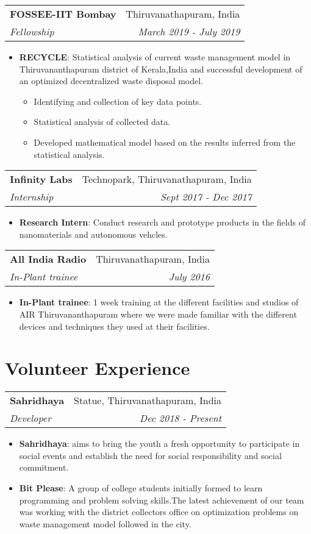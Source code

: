 \documentclass[letterpaper,11pt]{article}
\makeatletter
\newcommand{\resumeItem}[2]{
  \item\small{
    \textbf{#1}{: #2 \vspace{-2pt}}
  }
}
\newcommand{\resumeSubheading}[4]{
  \vspace{-1pt}\item
    \begin{tabular*}{0.97\textwidth}[t]{l@{\extracolsep{\fill}}r}
      \textbf{#1} & #2 \\
      \textit{\small#3} & \textit{\small #4} \\
    \end{tabular*}\vspace{-5pt}
}
\newcommand{\resumeItemListStart}{\begin{itemize}}
\newcommand{\resumeItemListEnd}{\end{itemize}\vspace{-5pt}}
\makeatother
\begin{document}
    \resumeSubheading
      {FOSSEE-IIT Bombay}{Thiruvanathapuram, India}
      {Fellowship}{March 2019 - July 2019}
      \resumeItemListStart
        \resumeItem{RECYCLE}
          {Statistical analysis of current waste management model in Thiruvananthapuram district of Kerala,India and successful development of an optimized decentralized waste disposal model. }
          \begin{itemize}
              \item Identifying and collection of key data points.
              \item Statistical analysis of collected data.
              \item Developed mathematical model based on the results inferred from the statistical analysis.
         \end{itemize}
      \resumeItemListEnd

    \resumeSubheading
      {Infinity Labs}{Technopark, Thiruvanathapuram, India}
      {Internship}{Sept 2017 - Dec 2017}
      \resumeItemListStart
        \resumeItem{Research Intern}
          {Conduct research and prototype products in the fields of nanomaterials and autonomous vehcles. }
      \resumeItemListEnd
      
      \resumeSubheading
      {All India Radio}{Thiruvanathapuram, India}
      {In-Plant trainee}{July 2016}
      \resumeItemListStart
        \resumeItem{In-Plant trainee}
          {1 week training at the different facilities and studios of AIR Thiruvananthapuram where we were made familiar with the different devices and techniques they used at their facilities.}
      \resumeItemListEnd


\section{Volunteer Experience}
      \resumeSubheading
      {Sahridhaya}{Statue, Thiruvanathapuram, India}
      {Developer}{Dec 2018 - Present}
      \resumeItemListStart
      \resumeItem{Sahridhaya} {aims to bring the youth a fresh opportunity to participate in social events and establish the need for social responsibility and social commitment.}
        \resumeItem{Bit Please}
          {A group of college students initially formed to learn programming and problem solving skills.The latest achievement of our team was working with the district collectors office on optimization problems on waste management model followed in  the city.}

      \resumeItemListEnd
      
\end{document}
